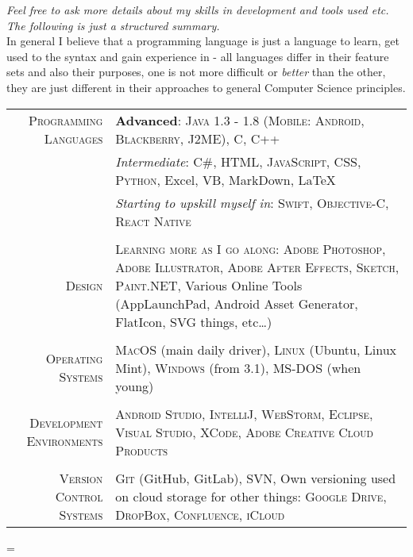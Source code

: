 \documentclass[a4paper,10pt,notitlepage]{article}
\newenvironment{absolutelynopagebreak}
  {\par\nobreak\vfil\penalty0\vfilneg
   \vtop\bgroup}
  {\par\xdef\tpd{\the\prevdepth}\egroup
   \prevdepth=\tpd}
\begin{document}
\begin{absolutelynopagebreak}
	\textit{Feel free to ask more details about my skills in development and tools used etc. The following is just a structured summary.} \\
	
	\footnotesize{In general I believe that a programming language is just a language to learn, get used to the syntax and gain experience in - all languages differ in their feature sets and also their purposes, one is not more difficult or \textit{better} than the other, they are just different in their approaches to general Computer Science principles.} \\
	
	\begin{tabular}{r|p{11cm}}
		
		\textsc{Programming Languages}    & \textbf{Advanced}: \textsc{Java 1.3 - 1.8 (Mobile: Android, Blackberry, J2ME)}, \textsc{C}, \textsc{C++} \\
		                                  & \emph{Intermediate}: \textsc{C\#}, \textsc{HTML}, \textsc{JavaScript}, \textsc{CSS}, \textsc{Python}, Excel, VB, MarkDown, {\fb \LaTeX} \setmainfont[SmallCapsFont=Fontin-SmallCaps.otf]{Fontin.otf} \\
		                                  & \emph{Starting to upskill myself in}: \textsc{Swift}, \textsc{Objective-C}, \textsc{React Native} \\
		                                  
		\multicolumn{2}{c}{}\\
		
		\textsc{Design}                   & \textsc{Learning more as I go along}: \textsc{Adobe Photoshop}, \textsc{Adobe Illustrator}, \textsc{Adobe After Effects}, \textsc{Sketch}, \textsc{Paint.NET}, Various Online Tools (AppLaunchPad, Android Asset Generator, FlatIcon, SVG things, etc\ldots) \\
		
		\multicolumn{2}{c}{}\\
		
		\textsc{Operating Systems}        & \textsc{MacOS} (main daily driver), \textsc{Linux} (Ubuntu, Linux Mint), \textsc{Windows} (from 3.1), \textsc{MS-DOS} (when young) \\
		 
		\multicolumn{2}{c}{} \\
		 
		\textsc{Development Environments} & \textsc{Android Studio}, \textsc{IntelliJ}, \textsc{WebStorm}, \textsc{Eclipse}, \textsc{Visual Studio}, \textsc{XCode}, \textsc{Adobe Creative Cloud Products} \\
		 
		\multicolumn{2}{c}{} \\
		 
		\textsc{Version Control Systems}  & \textsc{Git} (GitHub, GitLab), \textsc{SVN}, Own versioning used on cloud storage for other things: \textsc{Google Drive}, \textsc{DropBox}, \textsc{Confluence}, \textsc{iCloud} \\    
		 
	\end{tabular}
	
\end{absolutelynopagebreak}
	
	
\end{document}
